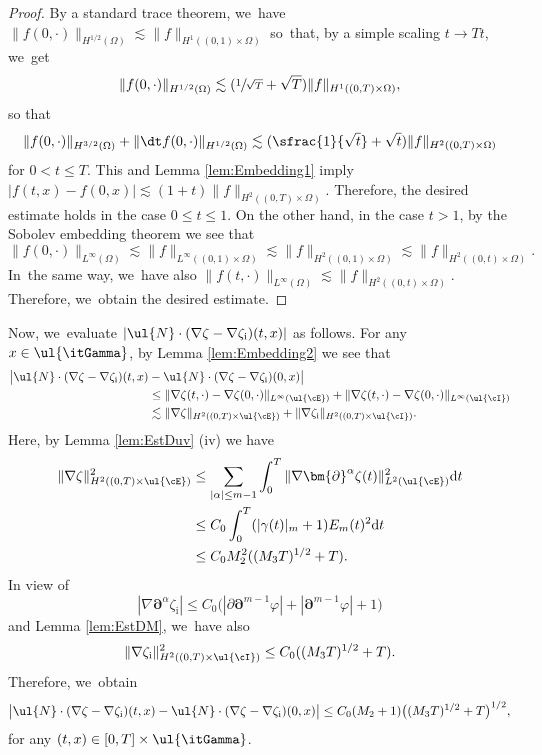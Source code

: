 \begin{proof}
By a standard trace theorem, we~have $\|f(0,\cdot)\|_{H^{1/2}(\Omega)} \lesssim \|f\|_{H^1((0,1)\times\Omega)}$ so~that, by a simple scaling $t\to Tt$, we~get
\[
\|f(0,\cdot)\|_{H^{1/2}(\Omega)} \lesssim (\sfrac{1}{\sqrt{T}}+\sqrt{T})\|f\|_{H^1((0,T)\times\Omega)},
\]
so that
\[
\|f(0,\cdot)\|_{H^{3/2}(\Omega)} + \|\dt f(0,\cdot)\|_{H^{1/2}(\Omega)} \lesssim (\sfrac{1}{\sqrt{t}}+\sqrt{t})\|f\|_{H^2((0,T)\times\Omega)}
\]
for $0<t\leq T$.
This and Lemma \ref{lem:Embedding1} imply $|f(t,x)-f(0,x)|\lesssim (1+t) \|f\|_{H^2((0,T)\times\Omega)}$.
Therefore, the desired estimate holds in the case $0\leq t\leq1$.
On the other hand, in the case $t>1$, by the Sobolev embedding theorem we see that
\[
\|f(0,\cdot)\|_{L^\infty(\Omega)} \lesssim \|f\|_{L^\infty((0,1)\times\Omega)} \lesssim \|f\|_{H^2((0,1)\times\Omega)} \lesssim \|f\|_{H^2((0,t)\times\Omega)}.
\]
In~the same way, we~have also $\|f(t,\cdot)\|_{L^\infty(\Omega)}\lesssim \|f\|_{H^2((0,t)\times\Omega)}$.
Therefore, we~obtain the desired estimate.
\end{proof}

Now, we~evaluate $|\ul{N}\cdot(\nabla\zeta-\nabla\zeta_\mathrm{i})(t,x)|$ as follows.
For any $x\in\ul{\itGamma}$, by Lemma \ref{lem:Embedding2} we see that
\begin{align*}
\bigl|\ul{N}\cdot(\nabla\zeta-\nabla\zeta_\mathrm{i})(t,x)&-\ul{N}\cdot(\nabla\zeta-\nabla\zeta_\mathrm{i})(0,x)\bigr| \\
&\leq \|\nabla\zeta(t,\cdot)-\nabla\zeta(0,\cdot)\|_{L^\infty(\ul{\cE})} + \|\nabla\zeta(t,\cdot)-\nabla\zeta(0,\cdot)\|_{L^\infty(\ul{\cI})} \\
&\lesssim \|\nabla\zeta\|_{H^2((0,T)\times\ul{\cE})} + \|\nabla\zeta_\mathrm{i}\|_{H^2((0,T)\times\ul{\cI})}.
\end{align*}
Here, by Lemma \ref{lem:EstDuv} (iv) we have
\begin{align*}
\|\nabla\zeta\|_{H^2((0,T)\times\ul{\cE})}^2
&\leq \sum_{|\alpha|\leq m-1}\int_0^T\|\nabla\bm{\partial}^\alpha\zeta(t)\|_{L^2(\ul{\cE})}^2 {\rm d}t \\
&\leq C_0\int_0^T(|\gamma(t)|_m+1)E_m(t)^2 {\rm d}t \\
&\leq C_0M_2^2((M_3T)^{1/2}+T).
\end{align*}
In view of
\[
|\nabla\bm{\partial}^\alpha\zeta_\mathrm{i}| \leq C_0\bigl(|\partial\bm{\partial}^{m-1}\varphi|+|\bm{\partial}^{m-1}\varphi|+1\bigr)
\]
and Lemma \ref{lem:EstDM}, we~have also
\[
\|\nabla\zeta_\mathrm{i}\|_{H^2((0,T)\times\ul{\cI})}^2 \leq C_0((M_3T)^{1/2}+T).
\]
Therefore, we~obtain
\begin{equation}\label{TransCond2}
\bigl|\ul{N}\cdot(\nabla\zeta-\nabla\zeta_\mathrm{i})(t,x)-\ul{N}\cdot(\nabla\zeta-\nabla\zeta_\mathrm{i})(0,x)\bigr|
\leq C_0(M_2+1)\bigl((M_3T)^{1/2}+T\bigr)^{1/2},
\end{equation}
for any $(t,x)\in[0,T]\times\ul{\itGamma}$.

